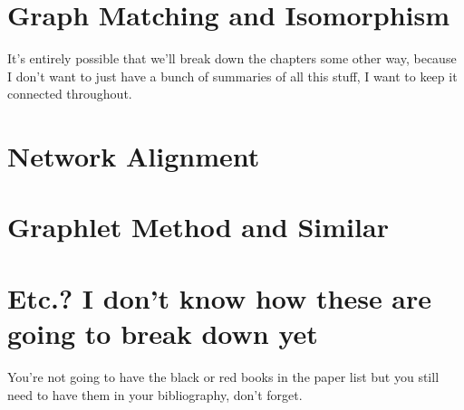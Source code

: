 \documentclass[12pt]{thesis}
\theoremstyle{plain}
\theoremstyle{definition}
\theoremstyle{remark}
\begin{document}



\chapter{Graph Matching and Isomorphism}

It's entirely possible that we'll break down the chapters some other way, because I don't want to just have a bunch of summaries of all this stuff, I want to keep it connected throughout.




\chapter{Network Alignment}

\chapter{Graphlet Method and Similar}

\chapter{Etc.? I don't know how these are going to break down yet}




You're not going to have the black or red books in the paper list but you still need to have them in your bibliography, don't forget.

\appendix




\printindex
\end{document}

